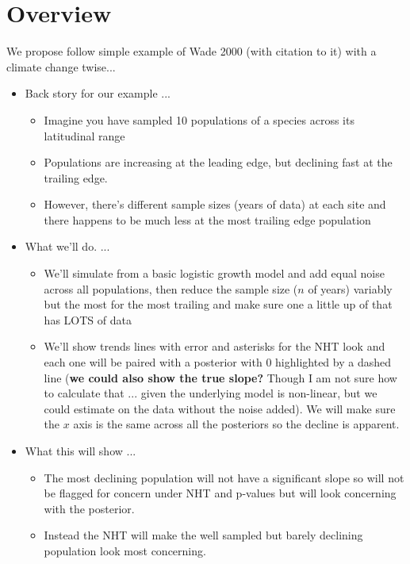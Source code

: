 \documentclass[11pt]{article}
\begin{document}

\renewcommand{\refname}{\CHead{}}


\section*{Overview}

We propose follow simple example of Wade 2000 (with citation to it) with a climate change twise... 
\begin{itemize}
\item Back story for our example ... 
\begin{itemize}
\item Imagine you have sampled 10 populations of a species across its latitudinal range
\item Populations are increasing at the leading edge, but declining fast at the trailing edge.
\item However, there's different sample sizes (years of data) at each site and there happens to be much less at the most trailing edge population
\end{itemize}
\item What we'll do. ... 
\begin{itemize}
\item We'll simulate from a basic logistic growth model and add equal noise across all populations, then reduce the sample size ($n$ of years) variably but the most for the most trailing and make sure one a little up of that has LOTS of data
\item We'll show trends lines with error and asterisks for the NHT look and each one will be paired with a posterior with 0 highlighted by a dashed line ({\bf we could also show the true slope?} Though I am not sure how to calculate that ... given the underlying model is non-linear, but we could estimate on the data without the noise added). We will make sure the $x$ axis is the same across all the posteriors so the decline is apparent. 
\end{itemize}
\item What this will show ... 
\begin{itemize}
\item The most declining population will not have a significant slope so will not be flagged for concern under NHT and p-values but will look concerning with the posterior.
\item Instead the NHT will make the well sampled but barely declining population look most concerning. 
\end{itemize}
\end{itemize}
\end{document}
